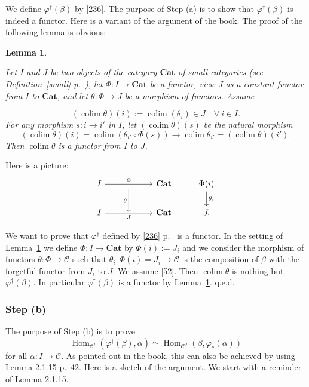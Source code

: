\documentclass[12pt]{article}
\newtheorem{lem}[thm]{Lemma}
\theoremstyle{remark}
\theoremstyle{definition}
\newcommand{\C}{\mathcal C}
\newcommand{\Cat}{\mathbf{Cat}}
\newcommand{\pp}{\varphi}
\DeclareMathOperator*{\colim}{colim}
\DeclareMathOperator{\Hom}{Hom}
\begin{document}
We define $\pp^\dagger(\beta)$ by \eqref{236}. The purpose of Step (a) is to show that $\pp^\dagger(\beta)$ is indeed a functor. Here is a variant of the argument of the book. The proof of the following lemma is obvious: 

\begin{lem}\label{r52}

Let $I$ and $J$ be two objects of the category $\Cat$ of small categories (see Definition~\ref{small} p.~\pageref{small}), let $\Phi:I\to\Cat$ be a functor, view $J$ as a constant functor from $I$ to $\Cat$, and let $\theta:\Phi\to J$ be a morphism of functors. Assume 

\begin{equation}\label{52} 
(\colim\theta)(i):=\colim(\theta_i)\in J\quad\forall\ i\in I. 
\end{equation} 
%
For any morphism $s:i\to i'$ in $I$, let $(\colim\theta)(s)$ be the natural morphism 
$$
(\colim\theta)(i)=\colim(\theta_{i'}\circ\Phi(s))\to
\colim\theta_{i'}=(\colim\theta)(i'). 
$$ 
Then $\colim\theta$ is a functor from $I$ to $J$. 
%
\end{lem}
%
Here is a picture:
$$
\begin{tikzcd}
I\ar{rr}{\Phi}&\ar{d}[swap]{\theta}&\Cat&\Phi(i)\ar{d}{\theta_i}\\ 
I\ar{rr}[swap]{J}&{}&\Cat&J.
\end{tikzcd}
$$

We want to prove that $\pp^\dagger$ defined by \eqref{236} p.~\pageref{236} is a functor. In the setting of Lemma~\ref{r52} we define $\Phi:I\to\Cat$ by $\Phi(i):=J_i$ and we consider the morphism of functors $\theta:\Phi\to\C$ such that $\theta_i:\Phi(i)=J_i\to\C$ is the composition of $\beta$ with the forgetful functor from $J_i$ to $J$. We assume \eqref{52}. Then $\colim\theta$ is nothing but $\pp^\dagger(\beta)$. In particular $\pp^\dagger(\beta)$ is a functor by Lemma~\ref{r52}. q.e.d.

%

\subsubsection{Step (b)}

The purpose of Step (b) is to prove 
\begin{equation}\label{stepb}
\Hom_{\C^I}(\pp^\dagger(\beta),\alpha)\simeq\Hom_{\C^J}(\beta,\pp_*(\alpha)) 
\end{equation} 
for all $\alpha:I\to\C$. As pointed out in the book, this can also be achieved by using Lemma 2.1.15 p.~42. Here is a sketch of the argument. We start with a reminder of Lemma 2.1.15. 
\end{document}
